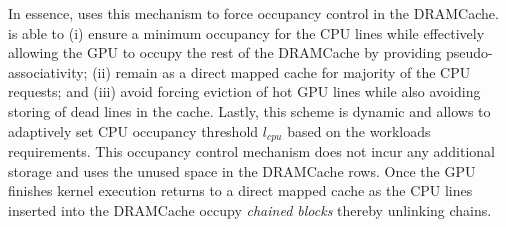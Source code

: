 \par In essence, \cachename uses this \chaining mechanism to force occupancy control in the DRAMCache. \chaining is able to 
(i) ensure a minimum occupancy for the CPU lines while effectively allowing the GPU to occupy the rest of the DRAMCache by providing pseudo-associativity;
(ii) remain as a direct mapped cache for majority of the CPU requests; and
(iii) avoid forcing eviction of hot GPU lines while also avoiding storing of dead lines in the cache.
Lastly, this scheme is dynamic and allows to adaptively set CPU occupancy threshold \textit{$l_{cpu}$} based on the workloads requirements. This occupancy control mechanism does not incur any additional storage and uses the unused space in the DRAMCache rows. Once the GPU finishes kernel execution \cachename returns to a direct mapped cache as the CPU lines inserted into the DRAMCache occupy \textit{chained blocks} thereby unlinking chains. 


